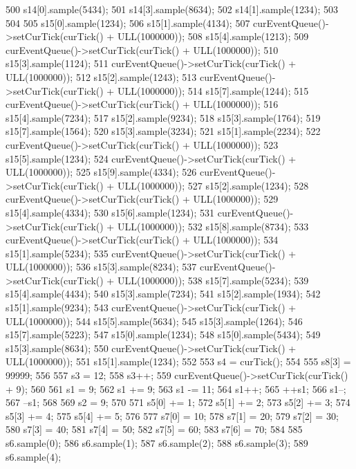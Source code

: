 \begin{DoxyCode}
{500     s14[0].sample(5434);
501     s14[3].sample(8634);
502     s14[1].sample(1234);
503 
504 
505     s15[0].sample(1234);
506     s15[1].sample(4134);
507     curEventQueue()->setCurTick(curTick() + ULL(1000000));
508     s15[4].sample(1213);
509     curEventQueue()->setCurTick(curTick() + ULL(1000000));
510     s15[3].sample(1124);
511     curEventQueue()->setCurTick(curTick() + ULL(1000000));
512     s15[2].sample(1243);
513     curEventQueue()->setCurTick(curTick() + ULL(1000000));
514     s15[7].sample(1244);
515     curEventQueue()->setCurTick(curTick() + ULL(1000000));
516     s15[4].sample(7234);
517     s15[2].sample(9234);
518     s15[3].sample(1764);
519     s15[7].sample(1564);
520     s15[3].sample(3234);
521     s15[1].sample(2234);
522     curEventQueue()->setCurTick(curTick() + ULL(1000000));
523     s15[5].sample(1234);
524     curEventQueue()->setCurTick(curTick() + ULL(1000000));
525     s15[9].sample(4334);
526     curEventQueue()->setCurTick(curTick() + ULL(1000000));
527     s15[2].sample(1234);
528     curEventQueue()->setCurTick(curTick() + ULL(1000000));
529     s15[4].sample(4334);
530     s15[6].sample(1234);
531     curEventQueue()->setCurTick(curTick() + ULL(1000000));
532     s15[8].sample(8734);
533     curEventQueue()->setCurTick(curTick() + ULL(1000000));
534     s15[1].sample(5234);
535     curEventQueue()->setCurTick(curTick() + ULL(1000000));
536     s15[3].sample(8234);
537     curEventQueue()->setCurTick(curTick() + ULL(1000000));
538     s15[7].sample(5234);
539     s15[4].sample(4434);
540     s15[3].sample(7234);
541     s15[2].sample(1934);
542     s15[1].sample(9234);
543     curEventQueue()->setCurTick(curTick() + ULL(1000000));
544     s15[5].sample(5634);
545     s15[3].sample(1264);
546     s15[7].sample(5223);
547     s15[0].sample(1234);
548     s15[0].sample(5434);
549     s15[3].sample(8634);
550     curEventQueue()->setCurTick(curTick() + ULL(1000000));
551     s15[1].sample(1234);
552 
553     s4 = curTick();
554 
555     s8[3] = 99999;
556 
557     s3 = 12;
558     s3++;
559     curEventQueue()->setCurTick(curTick() + 9);
560 
561     s1 = 9;
562     s1 += 9;
563     s1 -= 11;
564     s1++;
565     ++s1;
566     s1--;
567     --s1;
568 
569     s2 = 9;
570 
571     s5[0] += 1;
572     s5[1] += 2;
573     s5[2] += 3;
574     s5[3] += 4;
575     s5[4] += 5;
576 
577     s7[0] = 10;
578     s7[1] = 20;
579     s7[2] = 30;
580     s7[3] = 40;
581     s7[4] = 50;
582     s7[5] = 60;
583     s7[6] = 70;
584 
585     s6.sample(0);
586     s6.sample(1);
587     s6.sample(2);
588     s6.sample(3);
589     s6.sample(4);
}
\end{DoxyCode}
